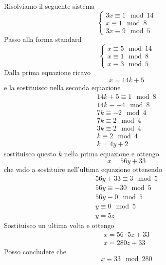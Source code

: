 \begin{example}
	Risolviamo il seguente sistema
	\begin{equation*}
		\begin{cases}
			3x \equiv 1 \mod{14} \\
			x \equiv 1 \mod{8}   \\
			3x \equiv 9 \mod{5}
		\end{cases}
	\end{equation*}
	Passo alla forma standard
	\begin{equation*}
		\begin{cases}
			x \equiv 5 \mod{14} \\
			x \equiv 1 \mod{8}  \\
			x \equiv 3 \mod{5}
		\end{cases}
	\end{equation*}
	Dalla prima equazione ricavo
	\begin{equation*}
		x = 14k + 5
	\end{equation*}
	e la sostituisco nella seconda equazione
	\begin{equation*}
		\begin{array}{l}
			14k + 5 \equiv 1 \mod{8} \\
			14k \equiv -4 \mod{8}    \\
			7k \equiv -2 \mod{4}     \\
			7k \equiv 2 \mod{4}      \\
			3k \equiv 2 \mod{4}      \\
			k \equiv 2 \mod{4}       \\
			k = 4y + 2
		\end{array}
	\end{equation*}
	sostituisco questo $k$ nella prima equazione e ottengo
	\begin{equation*}
		x = 56y + 33
	\end{equation*}
	che vado a sostituire nell'ultima equazione ottenendo
	\begin{equation*}
		\begin{array}{l}
			56y + 33 \equiv 3 \mod{5} \\
			56y \equiv -30 \mod{5}    \\
			56y \equiv 0 \mod{5}      \\
			y \equiv 0 \mod{5}        \\
			y = 5z
		\end{array}
	\end{equation*}
	Sostituisco un ultima volta e ottengo
	\begin{equation*}
		\begin{array}{l}
			x = 56 \cdot 5z + 33 \\
			x = 280z + 33
		\end{array}
	\end{equation*}
	Posso concludere che
	\begin{equation*}
		x \equiv 33 \mod{280}
	\end{equation*}
\end{example}

